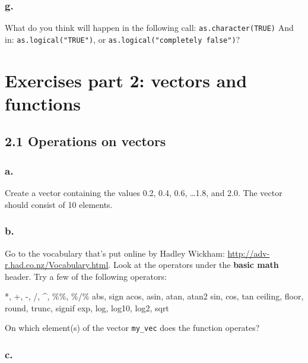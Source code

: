 \documentclass[]{article}
\begin{document}
\hypertarget{g.}{%
\subsubsection{g.}\label{g.}}

What do you think will happen in the following call:
\texttt{as.character(TRUE)} And in: \texttt{as.logical("TRUE")}, or
\texttt{as.logical("completely\ false")}?

\newpage

\hypertarget{exercises-part-2-vectors-and-functions}{%
\section{Exercises part 2: vectors and
functions}\label{exercises-part-2-vectors-and-functions}}

\hypertarget{operations-on-vectors}{%
\subsection{2.1 Operations on vectors}\label{operations-on-vectors}}

\hypertarget{a.-2}{%
\subsubsection{a.}\label{a.-2}}

Create a vector containing the values 0.2, 0.4, 0.6, \ldots 1.8, and
2.0. The vector should consist of 10 elements.

\hypertarget{b.-2}{%
\subsubsection{b.}\label{b.-2}}

Go to the vocabulary that's put online by Hadley Wickham:
\url{http://adv-r.had.co.nz/Vocabulary.html}. Look at the operators
under the \textbf{basic math} header. Try a few of the following
operators:

*, +, -, /, \^{}, \%\%, \%/\% abs, sign acos, asin, atan, atan2 sin,
cos, tan ceiling, floor, round, trunc, signif exp, log, log10, log2,
sqrt

On which element(s) of the vector \texttt{my\_vec} does the function
operates?

\hypertarget{c.-2}{%
\subsubsection{c.}\label{c.-2}}
\end{document}
